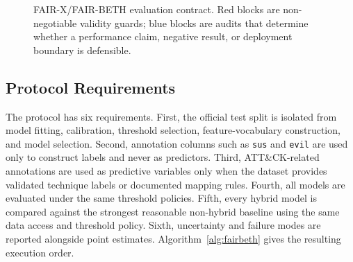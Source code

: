 \documentclass[10pt,journal,compsoc]{IEEEtran}
\begin{document}
\begin{figure}[t]
{
}
\caption{FAIR-X/FAIR-BETH evaluation contract. Red blocks are non-negotiable validity guards; blue blocks are audits that determine whether a performance claim, negative result, or deployment boundary is defensible.}
\label{fig:fairx_protocol}
\end{figure}

\subsection{Protocol Requirements}

The protocol has six requirements. First, the official test split is isolated from model fitting, calibration, threshold selection, feature-vocabulary construction, and model selection. Second, annotation columns such as \texttt{sus} and \texttt{evil} are used only to construct labels and never as predictors. Third, ATT\&CK-related annotations are used as predictive variables only when the dataset provides validated technique labels or documented mapping rules. Fourth, all models are evaluated under the same threshold policies. Fifth, every hybrid model is compared against the strongest reasonable non-hybrid baseline using the same data access and threshold policy. Sixth, uncertainty and failure modes are reported alongside point estimates. Algorithm~\ref{alg:fairbeth} gives the resulting execution order.
\end{document}
